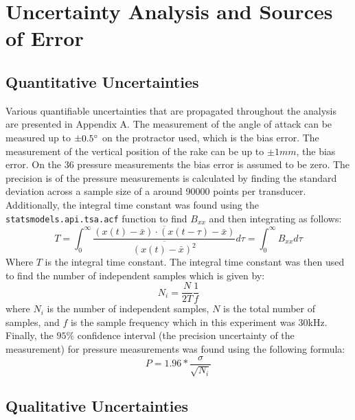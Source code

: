 \documentclass[11pt, letterpaper]{article}
\begin{document}
\section{Uncertainty Analysis and Sources of Error}

\subsection{Quantitative Uncertainties}

Various quantifiable uncertainties that are propagated throughout the analysis are presented in Appendix A. The measurement of the angle of attack can be measured up to $\pm 0.5 \degree$ on the protractor used, which is the bias error. The measurement of the vertical position of the rake can be up to $\pm 1 mm$, the bias error. On the 36 pressure measurements the bias error is assumed to be zero. The precision is of the pressure measurements is calculated by finding the standard deviation across a sample size of a around 90000 points per transducer. Additionally, the integral time constant was found using the \lstinline{statsmodels.api.tsa.acf} function to find $B_{xx}$ and then integrating as follows: 
\begin{equation}\label{eq:autocorrelation}
    T = \int_{0}^{\infty} \frac{\overline{(x(t)-\bar{x})\cdot(x(t-\tau)-\bar{x})}}{\overline{(x(t) - \bar{x})^2}} d\tau = \int_{0}^{\infty} B_{xx} d\tau
\end{equation}
Where $T$ is the integral time constant. The integral time constant was then used to find the number of independent samples which is given by:
\begin{equation}
    N_i = \frac{N}{2T}\frac{1}{f} 
\end{equation}
where $N_i$ is the number of independent samples, $N$ is the total number of samples, and $f$ is the sample frequency which in this experiment was 30kHz. Finally, the $95\%$ confidence interval (the precision uncertainty of the measurement) for pressure measurements was found using the following formula:
\begin{equation}
    P = 1.96*\frac{\sigma}{\sqrt{N_i}}
\end{equation}

\subsection{Qualitative Uncertainties}
\end{document}
